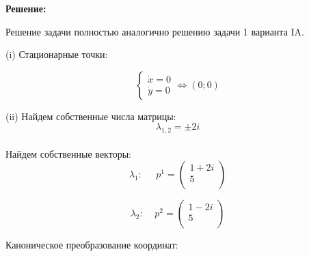 \documentclass[a4paper, 12pt]{article}
\begin{document}
\textbf{Решение:} \par
Решение задачи полностью аналогично решению задачи 1 варианта IA.  

(i) Стационарные точки:

\[
\left\{
\begin{array}{lr}
\dot{x} = 0\\
\dot{y} = 0
\end{array}
\right.
\Leftrightarrow (0;0)
\]


(ii) Найдем собственные числа матрицы:
\[\lambda_{1,2}=\pm2i\]
\\Найдем собственные векторы:
\[\lambda_1:\;\;\;\;\; p^1=
\left(
\begin{array}{cc}
1+2i\\
5\\
\end{array}
\right)  
\]



\[\lambda_2:\;\;\;\; p^2=
\left(
\begin{array}{cc}
1-2i\\
5\\
\end{array}
\right) 
\]


 Каноническое преобразование координат:
\end{document}
